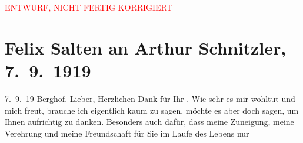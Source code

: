 
\begin{center}
            \textcolor{red}{ENTWURF, NICHT FERTIG KORRIGIERT}
                      \end{center}
            
         
         \renewcommand{\erwaehntePersonen}{Personen: Frieda Pollak, Ottilie Salten, Olga Schnitzler}
         \renewcommand{\erwaehnteOrte}{Orte: Berghof, Salzburg, Unterach am Attersee, Wien}
         \renewcommand{\erwaehnteWerke}{Werke: Felix Saltens fünfzigster Geburtstag, Neue Freie Presse}
               \section[Felix Salten an Arthur Schnitzler, 7. 9. 1919]{ Felix Salten an Arthur Schnitzler, 7. 9. 1919}\nopagebreak{}\rehead{ }\begin{ledgroupsized}[t]{13cm}\normalsize\beginnumbering \toendnotes[C]{\smallbreak\pagebreak[2]} 
\toendnotes[C]{\smallbreak}\pstart
           \raggedleft{}{\pb}7. 9. 19\pend
           \pstart
           \raggedleft{}Berghof.\pend
           \pstart{}Lieber,\pend\pstart
           Herzlichen Dank für Ihr \label{K_L03568-1v}\label{K_L03568-1h}. Wie
               sehr es mir wohltut und mich freut, brauche ich eigentlich kaum zu sagen, möchte es
               aber doch sagen, um Ihnen aufrichtig zu danken. Besonders auch dafür, dass meine
               Zuneigung, meine Verehrung und meine Freundschaft für Sie im Laufe des Lebens nur

\end{ledgroupsized}

